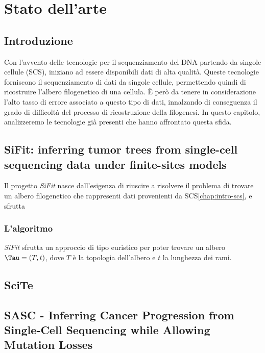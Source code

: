 
\chapter{Stato dell'arte}
\label{chap:art}


\section{Introduzione}
\label{chap:art-intro}
Con l'avvento delle tecnologie per il sequenziamento del DNA partendo da singole cellule (SCS), iniziano ad essere disponibili dati di alta qualità. Queste tecnologie forniscono il sequenziamento di dati da singole cellule, permettendo quindi di ricostruire l'albero filogenetico di una cellula. È però da tenere in considerazione l'alto tasso di errore associato a questo tipo di dati, innalzando di conseguenza il grado di difficoltà del processo di ricostruzione della filogenesi. 
In questo capitolo, analizzeremo le tecnologie già presenti che hanno affrontato questa sfida. 


\section{SiFit: inferring tumor trees from single-cell sequencing data under finite-sites models}
\label{chap:art-sifit}
Il progetto \textit{SiFit} nasce dall'esigenza di riuscire a risolvere il problema di trovare un albero filogenetico che rappresenti dati provenienti da SCS\autoref{chap:intro-scs}, e sfrutta 

\subsection{L'algoritmo}
\label{chap:art-sifit-algo}
\textit{SiFit} sfrutta un approccio di tipo euristico per poter trovare un albero $\Tau = (T, t)$, dove $T$ è la topologia dell'albero e $t$ la lunghezza dei rami.

\section{SciTe}
\label{chap:art-scite}

\section{SASC - Inferring Cancer Progression from Single-Cell Sequencing while Allowing Mutation Losses \cite{SCiccolellaSasc}}
\label{chap:art-sasc}
